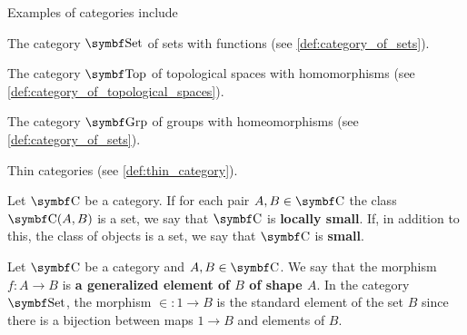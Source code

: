 \begin{example}\label{ex:categories}
  Examples of categories include

  \begin{defenum}
    \item The category \( \Bold{Set} \) of sets with functions (see \cref{def:category_of_sets}).
    \item The category \( \Bold{Top} \) of topological spaces with homomorphisms (see \cref{def:category_of_topological_spaces}).
    \item The category \( \Bold{Grp} \) of groups with homeomorphisms (see \cref{def:category_of_sets}).
    \item Thin categories (see \cref{def:thin_category}).
  \end{defenum}
\end{example}

\begin{definition}\label{def:category_cardinality}
  Let \( \Bold{C} \) be a category. If for each pair \( A, B \in \Bold C \) the class \( \Bold C(A, B) \) is a set, we say that \( \Bold C \) is \textbf{locally small}. If, in addition to this, the class of objects is a set, we say that \( \Bold C \) is \textbf{small}.
\end{definition}

\begin{definition}\label{def:generalized_element}\cite[definition 4.1.25]{Leinster2014}
  Let \( \Bold C \) be a category and \( A, B \in \Bold C \). We say that the morphism \( f: A \to B \) is \textbf{a generalized element of \( B \) of shape \( A \)}. In the category \( \Bold{Set} \), the morphism \( \in : 1 \to B \) is the standard element of the set \( B \) since there is a bijection between maps \( 1 \to B \) and elements of \( B \).
\end{definition}


